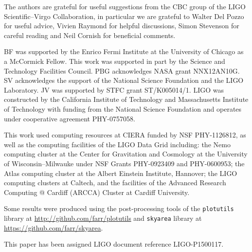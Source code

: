 \acknowledgements

The authors are grateful for useful suggestions from the CBC group of the LIGO Scientific--Virgo Collaboration, in particular we are grateful to Walter Del Pozzo for useful advice, Vivien Raymond for helpful discussions, Simon Stevenson for careful reading and Neil Cornish for beneficial comments.

BF was supported by the Enrico Fermi Institute at the University of Chicago as a McCormick Fellow.  This work was supported in part by the Science and Technology Facilities Council. PBG acknowledges NASA grant NNX12AN10G. SV acknowledges the support of the National Science Foundation and the LIGO Laboratory. JV was supported by STFC grant ST/K005014/1. LIGO was constructed by the California Institute of Technology and Massachusetts Institute of Technology with funding from the National Science Foundation and operates under cooperative agreement PHY-0757058.

This work used computing resources at CIERA funded by NSF PHY-1126812, as well as the computing facilities of the LIGO Data Grid including: the Nemo computing cluster at the Center for Gravitation and Cosmology at the University of Wisconsin--Milwauke under NSF Grants PHY-0923409 and PHY-0600953; the Atlas computing cluster at the Albert Einstein Institute, Hannover; the LIGO computing clusters at Caltech, and the facilities of the Advanced Research Computing @ Cardiff (ARCCA) Cluster at Cardiff University.

Some results were produced using the post-processing tools of the \texttt{plotutils} library at \url{http://github.com/farr/plotutils} and \texttt{skyarea} library at \url{https://github.com/farr/skyarea}.

This paper has been assigned LIGO document reference LIGO-P1500117.
  
  
